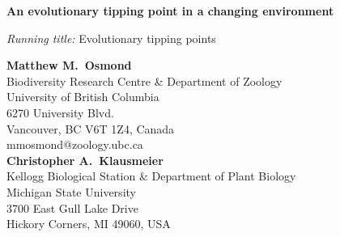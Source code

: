 \documentclass[12pt,letterpaper]{article} %
\begin{document}
\thispagestyle{empty}
\noindent\Large{\textbf{An evolutionary tipping point in a changing environment}} \vspace{0.5cm} %

\normalsize
\noindent \textit{Running title:} Evolutionary tipping points \vspace{0.5cm} %

\noindent \textbf{Matthew M.\ Osmond}\\
Biodiversity Research Centre \& Department of Zoology\\
University of British Columbia\\
6270 University Blvd. \\
Vancouver, BC V6T 1Z4, Canada\\
mmosmond@zoology.ubc.ca\\

\noindent \textbf{Christopher A.\ Klausmeier}\\
Kellogg Biological Station \& Department of Plant Biology\\
Michigan State University\\
3700 East Gull Lake Drive\\
Hickory Corners, MI 49060, USA\\

%
%
%
%
\end{document}
